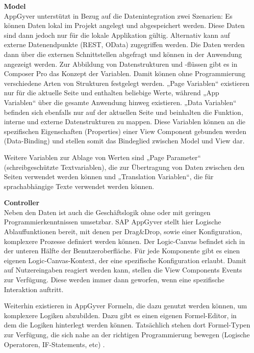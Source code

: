 \large{\textbf{Model}} \\
AppGyver unterstützt in Bezug auf die Datenintegration zwei Szenarien: Es können Daten lokal im Projekt angelegt und abgespeichert werden. Diese Daten sind dann jedoch nur für die lokale Applikation gültig. Alternativ kann auf externe Datenendpunkte (REST, OData) zugegriffen werden. Die Daten werden dann über die externen Schnittstellen abgefragt und können in der Anwendung angezeigt werden. Zur Abbildung von Datenstrukturen und -flüssen gibt es in Composer Pro das Konzept der Variablen. Damit können ohne Programmierung verschiedene Arten von Strukturen festgelegt werden. „Page Variablen“ existieren nur für die aktuelle Seite und enthalten beliebige Werte, während „App Variablen“ über die gesamte Anwendung hinweg existieren. „Data Variablen“ befinden sich ebenfalls nur auf der aktuellen Seite und beinhalten die Funktion, interne und externe Datenstrukturen zu mappen. Diese Variablen können an die spezifischen Eigenschaften (Properties) einer View Component gebunden werden (Data-Binding) und stellen somit das Bindeglied zwischen Model und View dar. 

Weitere Variablen zur Ablage von Werten sind „Page Parameter“ (schreibgeschützte Textvariablen), die zur Übertragung von Daten zwischen den Seiten verwendet werden können und „Translation Variablen“, die für sprachabhängige Texte verwendet werden können.

\large{\textbf{Controller}} \\
Neben den Daten ist auch die Geschäftslogik ohne oder mit geringen Programmierkenntnissen umsetzbar. SAP AppGyver stellt hier Logische Ablauffunktionen bereit, mit denen per Drag\&Drop, sowie einer Konfiguration, komplexere Prozesse definiert werden können. Der Logic-Canvas befindet sich in der unteren Hälfte der Benutzeroberfläche. Für jede Komponente gibt es einen eigenen Logic-Canvas-Kontext, der eine spezifische Konfiguration erlaubt. Damit auf Nutzereingaben reagiert werden kann, stellen die View Components Events zur Verfügung. Diese werden immer dann geworfen, wenn eine spezifische Interaktion auftritt. 

Weiterhin existieren in AppGyver Formeln, die dazu genutzt werden können, um komplexere Logiken abzubilden. Dazu gibt es einen eigenen Formel-Editor, in dem die Logiken hinterlegt werden können. Tatsächlich stehen dort Formel-Typen zur Verfügung, die sich nahe an der richtigen Programmierung bewegen (Logische Operatoren, IF-Statements, etc) \cite{appgyver:logic}.

